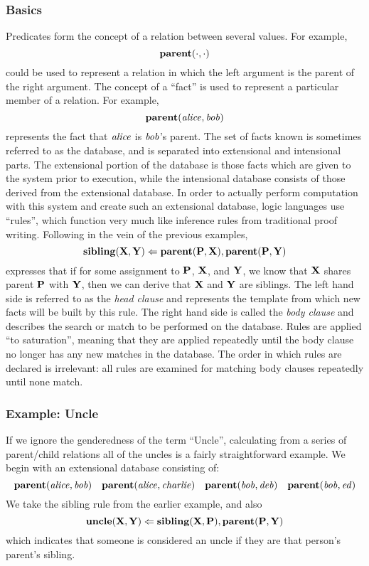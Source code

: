 \subsubsection{Basics}
Predicates form the concept of a relation between several values.
For example,
\[
        {\bf parent}(\cdot, \cdot)
\]
could be used to represent a relation in which the left argument is the parent of the right argument.
The concept of a ``fact'' is used to represent a particular member of a relation. For example,
\[
        {\bf parent}({\it alice}, {\it bob})
\]
represents the fact that ${\it alice}$ is ${\it bob}$'s parent.
The set of facts known is sometimes referred to as the database, and is separated into extensional and intensional parts.
The extensional portion of the database is those facts which are given to the system prior to execution, while the intensional database consists of those derived from the extensional database.
In order to actually perform computation with this system and create such an extensional database, logic languages use ``rules'', which function very much like inference rules from traditional proof writing.
Following in the vein of the previous examples,
\[
        {\bf sibling}({\bf X}, {\bf Y}) \Leftarrow {\bf parent}({\bf P}, {\bf X}), {\bf parent}({\bf P}, {\bf Y})
\]
expresses that if for some assignment to ${\bf P}$, ${\bf X}$, and ${\bf Y}$, we know that ${\bf X}$ shares parent ${\bf P}$ with ${\bf Y}$, then we can derive that ${\bf X}$ and ${\bf Y}$ are siblings.
The left hand side is referred to as the \emph{head clause} and represents the template from which new facts will be built by this rule.
The right hand side is called the \emph{body clause} and describes the search or match to be performed on the database.
Rules are applied ``to saturation'', meaning that they are applied repeatedly until the body clause no longer has any new matches in the database.
The order in which rules are declared is irrelevant: all rules are examined for matching body clauses repeatedly until none match.
\subsubsection{Example: Uncle}
If we ignore the genderedness of the term ``Uncle'', calculating from a series of parent/child relations all of the uncles is a fairly straightforward example.
We begin with an extensional database consisting of:
\[
        {\bf parent}({\it alice}, {\it bob})
        \quad {\bf parent}({\it alice}, {\it charlie})
        \quad {\bf parent}({\it bob}, {\it deb})
        \quad {\bf parent}({\it bob}, {\it ed})
\]
We take the sibling rule from the earlier example, and also
\[
        {\bf uncle}({\bf X}, {\bf Y}) \Leftarrow {\bf sibling}({\bf X}, {\bf P}), {\bf parent}({\bf P}, {\bf Y})
\]
which indicates that someone is considered an uncle if they are that person's parent's sibling.

